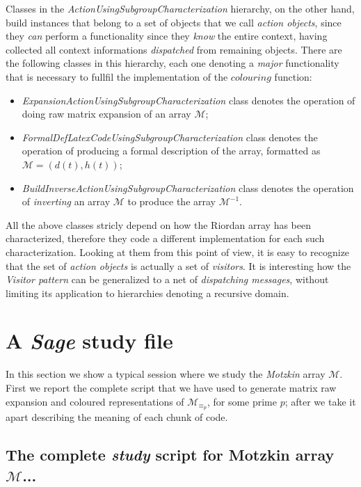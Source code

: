 Classes in the \emph{ActionUsingSubgroupCharacterization} hierarchy, on the other hand,
build instances that belong to a set of objects that we call \emph{action objects},
since they \emph{can} perform a functionality since they \emph{know} the entire context,
having collected all context informations \emph{dispatched} from remaining objects.
There are the following classes in this hierarchy, each one denoting a \emph{major}
functionality that is necessary to fullfil the implementation of the $colouring$ 
function:
\begin{itemize}
    \item \emph{ExpansionActionUsingSubgroupCharacterization} class denotes
        the operation of doing raw matrix expansion of an array $\mathcal{M}$; 
    \item \emph{FormalDefLatexCodeUsingSubgroupCharacterization} class denotes
        the operation of producing a formal description of the array, 
        formatted as $\mathcal{M}=(d(t),h(t))$;
    \item \emph{BuildInverseActionUsingSubgroupCharacterization} class denotes
        the operation of \emph{inverting} an array $\mathcal{M}$ to produce 
        the array $\mathcal{M}^{-1}$.
\end{itemize}

All the above classes stricly depend on how the Riordan array has been
characterized, therefore they code a different implementation for each such
characterization. Looking at them from this point of view, it is easy to
recognize that the set of \emph{action objects} is actually a set of
\emph{visitors}. It is interesting how the
\emph{Visitor pattern} can be generalized to a net of \emph{dispatching
messages}, without limiting its application to hierarchies denoting a recursive
domain.


\section{A \emph{Sage} study file}

In this section we show a typical session where we study the \emph{Motzkin}
array $\mathcal{M}$.  First we report the complete script that we have used to
generate matrix raw expansion and coloured representations of
$\mathcal{M}_{\equiv_{p}}$, for some prime $p$; after we take it apart
describing the meaning of each chunk of code.

\subsection{The complete \emph{study} script for Motzkin array $\mathcal{M}$...}


